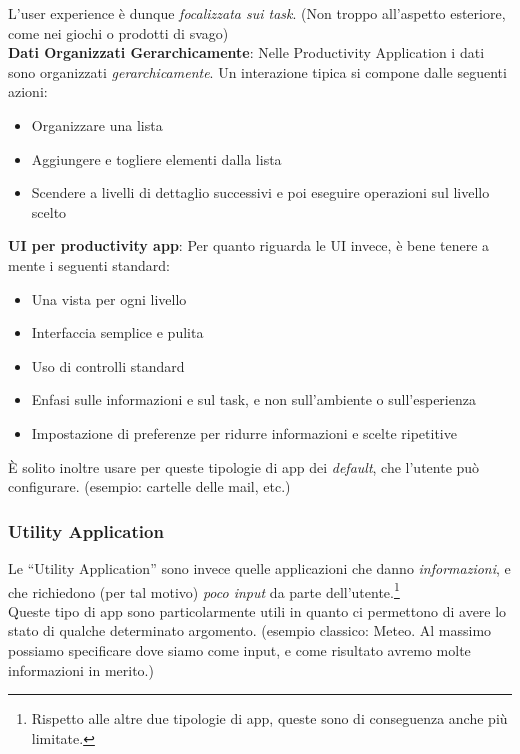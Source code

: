 \documentclass[oneside]{book}
\begin{document}
				L'user experience è dunque \emph{focalizzata sui task}. (Non troppo all'aspetto esteriore, come nei giochi o prodotti di svago) \\

				\textbf{Dati Organizzati Gerarchicamente}: Nelle Productivity Application i dati sono organizzati \emph{gerarchicamente}. Un interazione tipica si compone dalle seguenti azioni:
				\begin{itemize}
				\item Organizzare una lista 
				\item Aggiungere e togliere elementi dalla lista 
				\item Scendere a livelli di dettaglio successivi e poi eseguire operazioni sul livello scelto
				\end{itemize}

				\textbf{UI per productivity app}: Per quanto riguarda le UI invece, è bene tenere a mente i seguenti standard:
				\begin{itemize}
				\item Una vista per ogni livello
				\item Interfaccia semplice e pulita
				\item Uso di controlli standard
				\item Enfasi sulle informazioni e sul task, e non sull'ambiente o sull'esperienza
				\item Impostazione di preferenze per ridurre informazioni e scelte ripetitive
				\end{itemize}
				È solito inoltre usare per queste tipologie di app dei \emph{default}, che l'utente può configurare. (esempio: cartelle delle mail, etc.)

			\newpage
			\subsubsection{Utility Application}
				Le ``Utility Application'' sono invece quelle applicazioni che danno \emph{informazioni}, e che richiedono (per tal motivo) \emph{poco input} da parte dell'utente.\footnote{Rispetto alle altre due tipologie di app, queste sono di conseguenza anche più limitate.} \\
				
				Queste tipo di app sono particolarmente utili in quanto ci permettono di avere lo stato di qualche determinato argomento. (esempio classico: Meteo. Al massimo possiamo specificare dove siamo come input, e come risultato avremo molte informazioni in merito.) \\
\end{document}
